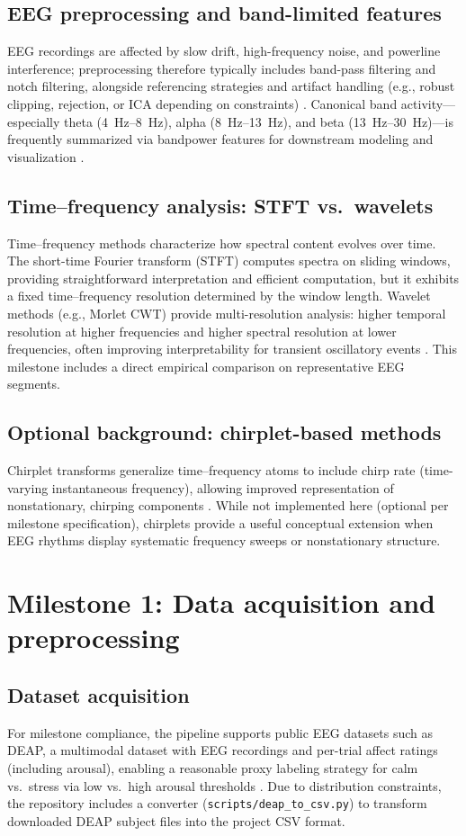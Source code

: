 \documentclass[11pt]{article}
\begin{document}
\subsection{EEG preprocessing and band-limited features}
EEG recordings are affected by slow drift, high-frequency noise, and powerline interference; preprocessing therefore typically includes band-pass filtering and notch filtering, alongside referencing strategies and artifact handling (e.g., robust clipping, rejection, or ICA depending on constraints) \cite{cohen2014}. Canonical band activity---especially theta (\SIrange{4}{8}{Hz}), alpha (\SIrange{8}{13}{Hz}), and beta (\SIrange{13}{30}{Hz})---is frequently summarized via bandpower features for downstream modeling and visualization \cite{cohen2014}.

\subsection{Time--frequency analysis: STFT vs.\ wavelets}
Time--frequency methods characterize how spectral content evolves over time. The short-time Fourier transform (STFT) computes spectra on sliding windows, providing straightforward interpretation and efficient computation, but it exhibits a fixed time--frequency resolution determined by the window length. Wavelet methods (e.g., Morlet CWT) provide multi-resolution analysis: higher temporal resolution at higher frequencies and higher spectral resolution at lower frequencies, often improving interpretability for transient oscillatory events \cite{cohen2014}. This milestone includes a direct empirical comparison on representative EEG segments.

\subsection{Optional background: chirplet-based methods}
Chirplet transforms generalize time--frequency atoms to include chirp rate (time-varying instantaneous frequency), allowing improved representation of nonstationary, chirping components \cite{mann1995}. While not implemented here (optional per milestone specification), chirplets provide a useful conceptual extension when EEG rhythms display systematic frequency sweeps or nonstationary structure.

\section{Milestone 1: Data acquisition and preprocessing}
\subsection{Dataset acquisition}
For milestone compliance, the pipeline supports public EEG datasets such as DEAP, a multimodal dataset with EEG recordings and per-trial affect ratings (including arousal), enabling a reasonable proxy labeling strategy for calm vs.\ stress via low vs.\ high arousal thresholds \cite{koelstra2012}. Due to distribution constraints, the repository includes a converter (\texttt{scripts/deap\_to\_csv.py}) to transform downloaded DEAP subject files into the project CSV format.
\end{document}
